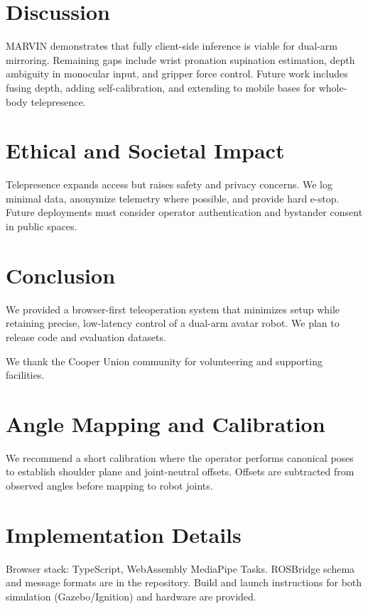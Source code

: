 \documentclass[manuscript,screen]{acmart} %
\begin{document}

\section{Discussion}
MARVIN demonstrates that fully client-side inference is viable for dual-arm mirroring. Remaining gaps include wrist pronation supination estimation, depth ambiguity in monocular input, and gripper force control. Future work includes fusing depth, adding self-calibration, and extending to mobile bases for whole-body telepresence.

\section{Ethical and Societal Impact}
Telepresence expands access but raises safety and privacy concerns. We log minimal data, anonymize telemetry where possible, and provide hard e-stop. Future deployments must consider operator authentication and bystander consent in public spaces.

\section{Conclusion}
We provided a browser-first teleoperation system that minimizes setup while retaining precise, low-latency control of a dual-arm avatar robot. We plan to release code and evaluation datasets.

\begin{acks}
We thank the Cooper Union community for volunteering and supporting facilities.
\end{acks}




\appendix
\section{Angle Mapping and Calibration}
We recommend a short calibration where the operator performs canonical poses to establish shoulder plane and joint-neutral offsets. Offsets are subtracted from observed angles before mapping to robot joints.

\section{Implementation Details}
Browser stack: TypeScript, WebAssembly MediaPipe Tasks. ROSBridge schema and message formats are in the repository. Build and launch instructions for both simulation (Gazebo/Ignition) and hardware are provided.
\end{document}
